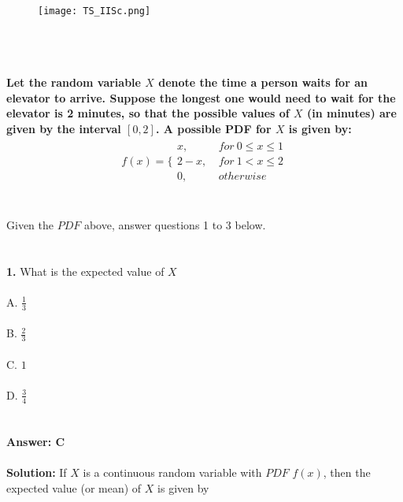 \documentclass[prl,twocolumn,showpacs,preprintnumbers,superscriptaddress]{revtex4}
\theoremstyle{plain}
\theoremstyle{definition}
\begin{document}
\begin{widetext}
\\
\\
\\

\begin{wrapfigure}
\centering
\end{wrapfigure}
\begin{figure}[h!]
 \begin{right}
  \hfill\texttt{[image: TS\_IISc.png]}
 \end{right}
\end{figure}
\\
\\
\\
\noindent\textbf{Let the random variable $X$ denote the time a person waits for an elevator to arrive. Suppose the longest one would need to wait for the elevator is 2 minutes, so that the possible values of $X$ (in minutes) are given by the interval $[0,2]$. A possible PDF for $X$ is given by:}
\\
\begin{align*}
    f(x) = \Bigg\{\begin{matrix}
x,&\  for\  0 \le x \le 1 \\
2 - x,&\  for\  1 < x \le 2 \\
0,&\  otherwise
\end{matrix}
\end{align*}
\\
\\
Given the $PDF$ above, answer questions 1 to 3 below.
\\
\\
\\
\textbf{1.} What is the expected value of $X$
\\
\\
\noindent A. $\frac{1}{3}$\\
\\
B. $\frac{2}{3}$\\
\\
C. $1$\\
\\
D. $\frac{3}{4}$
\\
\\
\\
\textbf{Answer: C}
\\
\\
\textbf{Solution:}
If $X$ is a continuous random variable with $PDF$ $f(x)$, then the expected value (or mean) of $X$ is given by

\end{widetext}
\end{document}
